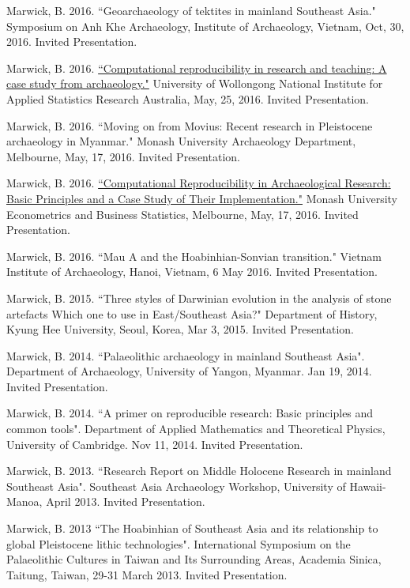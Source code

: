\ind Marwick, B. 2016. ``Geoarchaeology of tektites in mainland Southeast Asia." Symposium on Anh Khe Archaeology, Institute of Archaeology, Vietnam, Oct, 30, 2016. Invited Presentation.

\ind Marwick, B. 2016. \href{https://github.com/benmarwick/UOW-NIASRA-2016-talk}{``Computational reproducibility in research and teaching: A case study from archaeology."} University of Wollongong National Institute for Applied Statistics Research Australia, May, 25, 2016. Invited Presentation.

\ind Marwick, B. 2016. ``Moving on from Movius: Recent research in Pleistocene archaeology in Myanmar." Monash University Archaeology Department, Melbourne, May, 17, 2016. Invited Presentation.

\ind Marwick, B. 2016. \href{https://github.com/benmarwick/Monash-Wombat-2016-talk}{``Computational Reproducibility in Archaeological Research: Basic Principles and a Case Study of Their Implementation."} Monash University Econometrics and Business Statistics, Melbourne, May, 17, 2016. Invited Presentation.

\ind Marwick, B. 2016. ``Mau A and the Hoabinhian-Sonvian transition." Vietnam Institute of Archaeology, Hanoi, Vietnam, 6 May 2016. Invited Presentation.

\ind Marwick, B. 2015. ``Three styles of Darwinian evolution in the analysis of stone artefacts Which one to use in East/Southeast Asia?" Department of History, Kyung Hee University, Seoul, Korea, Mar 3, 2015. Invited Presentation.

\ind Marwick, B. 2014. ``Palaeolithic archaeology in mainland Southeast Asia". Department of Archaeology, University of Yangon, Myanmar. Jan 19, 2014. Invited Presentation.

\ind Marwick, B. 2014. ``A primer on reproducible research: Basic principles and common tools". Department of Applied Mathematics and Theoretical Physics, University of Cambridge. Nov 11, 2014. Invited Presentation.

\ind Marwick, B. 2013. ``Research Report on Middle Holocene Research in mainland Southeast Asia". Southeast Asia Archaeology Workshop, University of Hawaii-Manoa, April 2013. Invited Presentation.

\ind Marwick, B. 2013 ``The Hoabinhian of Southeast Asia and its relationship to global Pleistocene lithic technologies". International Symposium on the Palaeolithic Cultures in Taiwan and Its Surrounding Areas, Academia Sinica, Taitung, Taiwan, 29-31 March 2013.  Invited Presentation.

